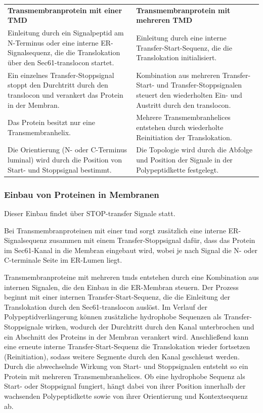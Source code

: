 \begin{mytable}
    \begin{tabular}{p{6cm} p{6cm}}
        \textbf{Transmembranprotein mit einer TMD} & \textbf{Transmembranprotein mit mehreren TMD} \\
        Einleitung durch ein Signalpeptid am N-Terminus oder eine interne ER-Signalsequenz, die die Translokation über den Sec61-\gls{translocon} startet.
        & Einleitung durch eine interne Transfer-Start-Sequenz, die die Translokation initialisiert. \\

        Ein einzelnes Transfer-Stoppsignal stoppt den Durchtritt durch den \gls{translocon} und verankert das Protein in der Membran.
        & Kombination aus mehreren Transfer-Start- und Transfer-Stoppsignalen steuert den wiederholten Ein- und Austritt durch den \gls{translocon}. \\

        Das Protein besitzt nur eine Transmembranhelix.
        & Mehrere Transmembranhelices entstehen durch wiederholte Reinitiation der Translokation. \\

        Die Orientierung (N- oder C-Terminus luminal) wird durch die Position von Start- und Stoppsignal bestimmt.
        & Die Topologie wird durch die Abfolge und Position der Signale in der Polypeptidkette festgelegt. \\
    \end{tabular}
\end{mytable} %

\subsubsection*{Einbau von Proteinen in Membranen}
Dieser Einbau findet über STOP-transfer
Signale statt. %

Bei Transmembranproteinen mit einer \gls{tmd} sorgt zusätzlich eine interne ER-Signalsequenz zusammen mit einem
Transfer-Stoppsignal dafür, dass das Protein im Sec61-Kanal in die Membran eingebaut wird, wobei je nach Signal die N- oder C-terminale Seite im ER-Lumen liegt.

Transmembranproteine mit mehreren \glspl{tmd} entstehen durch eine Kombination aus internen Signalen, die den Einbau 
in die ER-Membran steuern. 
Der Prozess beginnt mit einer internen Transfer-Start-Sequenz, die die Einleitung der Translokation durch den Sec61-\gls{translocon} auslöst. 
Im Verlauf der Polypeptidverlängerung können zusätzliche hydrophobe Sequenzen als Transfer-Stoppsignale wirken, wodurch der Durchtritt durch den Kanal unterbrochen und ein Abschnitt des Proteins in der Membran verankert wird.
Anschließend kann eine erneute interne Transfer-Start-Sequenz die Translokation wieder fortsetzen (Reinitiation), sodass weitere Segmente durch den Kanal geschleust werden.
Durch die abwechselnde Wirkung von Start- und Stoppsignalen entsteht so ein Protein mit mehreren Transmembranhelices.
Ob eine hydrophobe Sequenz als Start- oder Stoppsignal fungiert, hängt dabei von ihrer Position innerhalb der wachsenden Polypeptidkette sowie von ihrer Orientierung und Kontextsequenz ab.


